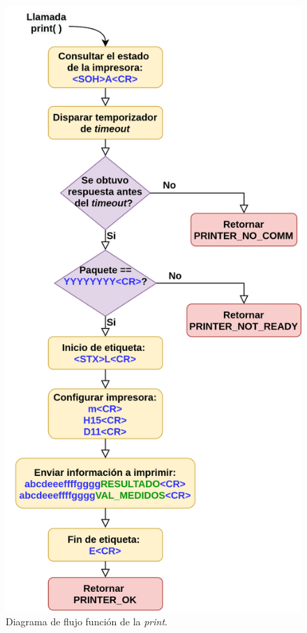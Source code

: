\pagebreak

\begin{figure}[htpb]
	\centering
	\includegraphics[scale=0.95]{./Figures/printer.png}
	\caption{Diagrama de flujo función de la \textit{print}.}
	\label{fig:printFunc}
\end{figure}

